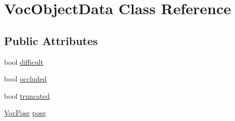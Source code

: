 \hypertarget{classVocObjectData}{\section{Voc\-Object\-Data Class Reference}
\label{classVocObjectData}
}
\subsection*{Public Attributes}
\begin{DoxyCompactItemize}
\item 
bool \hyperlink{classVocObjectData_ab4a2ac2a2d7c32b9e75c9385f967aafc}{difficult}
\item 
bool \hyperlink{classVocObjectData_ac7dc3d9150dd2bb0618aece74c51b1ca}{occluded}
\item 
bool \hyperlink{classVocObjectData_a9d030c2d235cdf582fdc3e0cb4bb4d54}{truncated}
\item 
\hyperlink{bagofwords__classification_8cpp_a64c3a5177131019758d4a386d8b18150}{Voc\-Pose} \hyperlink{classVocObjectData_a9113fd23f49bd891070545c4cbe3a50d}{pose}
\end{DoxyCompactItemize}



